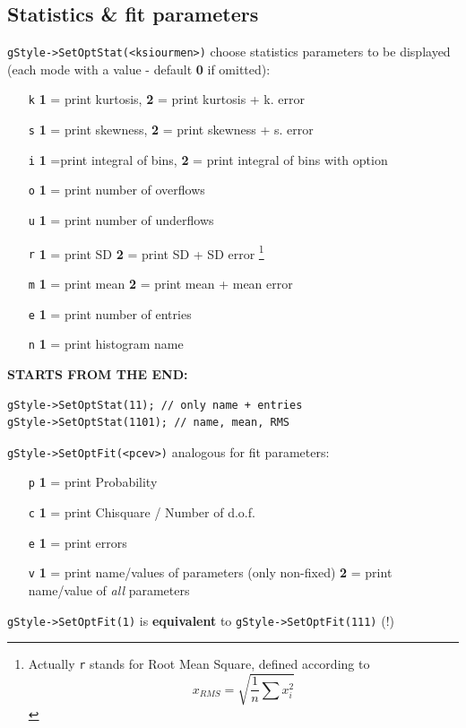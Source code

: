 \documentclass[10pt, twoside]{article}
\newcommand{\ttt}[1]{\colorbox{boxgray}{\texttt{#1}}}
\begin{document}
\subsection{Statistics \& fit parameters}
\ttt{gStyle->SetOptStat(<ksiourmen>)} choose statistics parameters to be displayed \\
(each mode with a value - default \textbf{0} if omitted):
\begin{itemize}
\item[\ttt{k}] \textbf{1} = print kurtosis, \textbf{2} = print kurtosis + k. error
\item[\ttt{s}] \textbf{1} = print skewness, \textbf{2} = print skewness + s. error
\item[\ttt{i}] \textbf{1} =print integral of bins, \textbf{2} = print integral of bins with option 
\item[\ttt{o}] \textbf{1} = print number of overflows
\item[\ttt{u}] \textbf{1} = print number of underflows
\item[\ttt{r}] \textbf{1} = print SD \textbf{2} = print SD + SD error \footnote{Actually \ttt{r} stands for Root Mean Square, defined according to 
\[x_{RMS} = \sqrt{\frac{1}{n} \sum x_i^2}\]
} 
\item[\ttt{m}] \textbf{1} = print mean \textbf{2} = print mean + mean error
\item[\ttt{e}] \textbf{1} = print number of entries
\item[\ttt{n}] \textbf{1} = print histogram name 
\end{itemize}
\textbf{STARTS FROM THE END:} 
\begin{verbatim}
gStyle->SetOptStat(11); // only name + entries
gStyle->SetOptStat(1101); // name, mean, RMS
\end{verbatim}
\ttt{gStyle->SetOptFit(<pcev>)} analogous for fit parameters:
\begin{itemize}
\item[\ttt{p}] \textbf{1} = print Probability
\item[\ttt{c}] \textbf{1} = print Chisquare / Number of d.o.f.
\item[\ttt{e}] \textbf{1} = print errors
\item[\ttt{v}] \textbf{1} = print name/values of parameters (only non-fixed) \textbf{2} = print name/value of \textit{all} parameters
\end{itemize}
\ttt{gStyle->SetOptFit(1)} is \textbf{equivalent} to \ttt{gStyle->SetOptFit(111)} (!)
\end{document}
